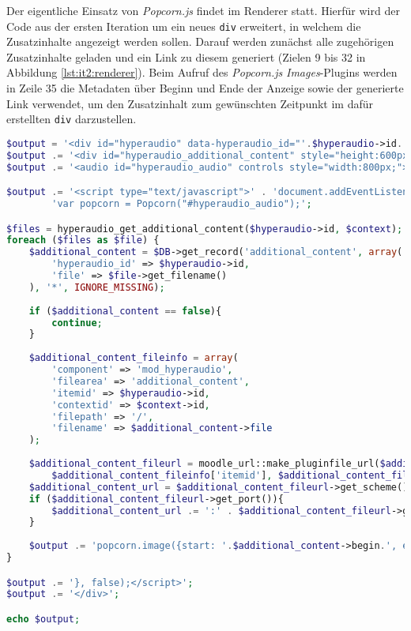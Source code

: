 Der eigentliche Einsatz von \textit{Popcorn.js} findet im Renderer statt. Hierfür wird der Code aus der ersten Iteration um ein neues \texttt{div} erweitert, in welchem die Zusatzinhalte angezeigt werden sollen. Darauf werden zunächst alle zugehörigen Zusatzinhalte geladen und ein Link zu diesem generiert (Zielen 9 bis 32 in Abbildung \ref{lst:it2:renderer}). Beim Aufruf des \textit{Popcorn.js} \textit{Images}-Plugins werden in Zeile 35 die Metadaten über Beginn und Ende der Anzeige sowie der generierte Link verwendet, um den Zusatzinhalt zum gewünschten Zeitpunkt im dafür erstellten \texttt{div} darzustellen.

\begin{lstlisting}[language=php,
             linewidth=\textwidth,
             caption={Ausschnitt der \textbf{renderer.php} in der 2. Iteration},
             label={lst:it2:renderer}]
$output = '<div id="hyperaudio" data-hyperaudio_id="'.$hyperaudio->id.'">';
$output .= '<div id="hyperaudio_additional_content" style="height:600px; width:800px;"></div>';
$output .= '<audio id="hyperaudio_audio" controls style="width:800px;">' . '<source src="' . $audio_url . '"/>' . '</audio>';

$output .= '<script type="text/javascript">' . 'document.addEventListener("DOMContentLoaded", function() {' .
		'var popcorn = Popcorn("#hyperaudio_audio");';

$files = hyperaudio_get_additional_content($hyperaudio->id, $context);
foreach ($files as $file) {
	$additional_content = $DB->get_record('additional_content', array(
		'hyperaudio_id' => $hyperaudio->id,
		'file' => $file->get_filename()
	), '*', IGNORE_MISSING);
	
	if ($additional_content == false){
		continue;
	}
	
	$additional_content_fileinfo = array(
		'component' => 'mod_hyperaudio',
		'filearea' => 'additional_content',
		'itemid' => $hyperaudio->id,
		'contextid' => $context->id,
		'filepath' => '/',
		'filename' => $additional_content->file
	);
	
	$additional_content_fileurl = moodle_url::make_pluginfile_url($additional_content_fileinfo['contextid'], $additional_content_fileinfo['component'], $additional_content_fileinfo['filearea'],
		$additional_content_fileinfo['itemid'], $additional_content_fileinfo['filepath'], $additional_content_fileinfo['filename']);
	$additional_content_url = $additional_content_fileurl->get_scheme() . '://' . $additional_content_fileurl->get_host() . $additional_content_fileurl->get_path();
	if ($additional_content_fileurl->get_port()){
		$additional_content_url .= ':' . $additional_content_fileurl->get_port();
	}
	
	$output .= 'popcorn.image({start: '.$additional_content->begin.', end: '.$additional_content->end.', href: "javascript:void(0);", src: "'.$additional_content_url.'", target: "hyperaudio_additional_content"});';
}

$output .= '}, false);</script>';
$output .= '</div>';

echo $output;
\end{lstlisting}

